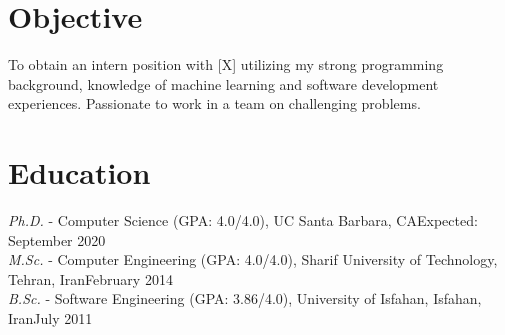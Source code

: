 \documentclass[letter]{res}
\begin{document}
\newif \iflong
\longtrue     %

\address{+1 (805) 886 7101 ~~~ 6520 El Colegio Rd, Apt 2308, Santa Barbara, CA 93106 ~~~ \href{mailto:omid55@cs.ucsb.edu}{omid55@cs.ucsb.edu}}
\begin{resume}
\noindent\makebox[\linewidth]{\rule{\paperwidth}{0.4pt}}


\section{Objective}
To obtain an intern position with [X] utilizing my strong programming background, knowledge of machine learning and software development experiences. Passionate to work in a team on challenging problems.


\section{Education}
{\sl Ph.D.} - Computer Science (GPA: 4.0/4.0), UC Santa Barbara, CA\hfill Expected: September 2020\vspace{-1mm}\\
{\sl M.Sc.} - Computer Engineering (GPA: 4.0/4.0), Sharif University of Technology, Tehran, Iran\hfill February 2014\vspace{-1mm}\\
{\sl B.Sc.} - Software Engineering (GPA: 3.86/4.0), University of Isfahan, Isfahan, Iran\hfill July 2011\vspace{-1mm}



\end{resume}
\end{document}
